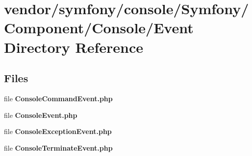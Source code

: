 \section{vendor/symfony/console/\+Symfony/\+Component/\+Console/\+Event Directory Reference}
\label{dir_3829cb78767684a7cbec8bcf78ff95e0}
\subsection*{Files}
\begin{DoxyCompactItemize}
\item 
file {\bf Console\+Command\+Event.\+php}
\item 
file {\bf Console\+Event.\+php}
\item 
file {\bf Console\+Exception\+Event.\+php}
\item 
file {\bf Console\+Terminate\+Event.\+php}
\end{DoxyCompactItemize}
